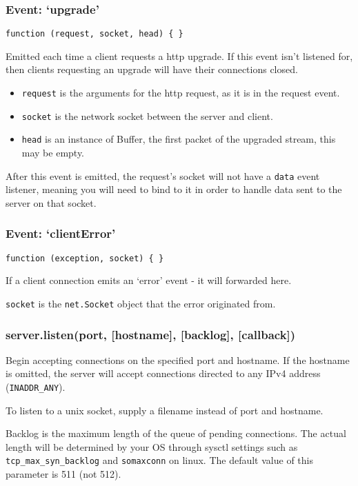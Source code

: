 \subsubsection{Event: `upgrade'}

\texttt{function (request, socket, head) \{ \}}

Emitted each time a client requests a http upgrade. If this event isn't
listened for, then clients requesting an upgrade will have their
connections closed.

\begin{itemize}
\item
  \texttt{request} is the arguments for the http request, as it is in
  the request event.
\item
  \texttt{socket} is the network socket between the server and client.
\item
  \texttt{head} is an instance of Buffer, the first packet of the
  upgraded stream, this may be empty.
\end{itemize}

After this event is emitted, the request's socket will not have a
\texttt{data} event listener, meaning you will need to bind to it in
order to handle data sent to the server on that socket.

\subsubsection{Event: `clientError'}

\texttt{function (exception, socket) \{ \}}

If a client connection emits an `error' event - it will forwarded here.

\texttt{socket} is the \texttt{net.Socket} object that the error
originated from.

\subsubsection{server.listen(port, {[}hostname{]}, {[}backlog{]},
{[}callback{]})}

Begin accepting connections on the specified port and hostname. If the
hostname is omitted, the server will accept connections directed to any
IPv4 address (\texttt{INADDR\_ANY}).

To listen to a unix socket, supply a filename instead of port and
hostname.

Backlog is the maximum length of the queue of pending connections. The
actual length will be determined by your OS through sysctl settings such
as \texttt{tcp\_max\_syn\_backlog} and \texttt{somaxconn} on linux. The
default value of this parameter is 511 (not 512).

